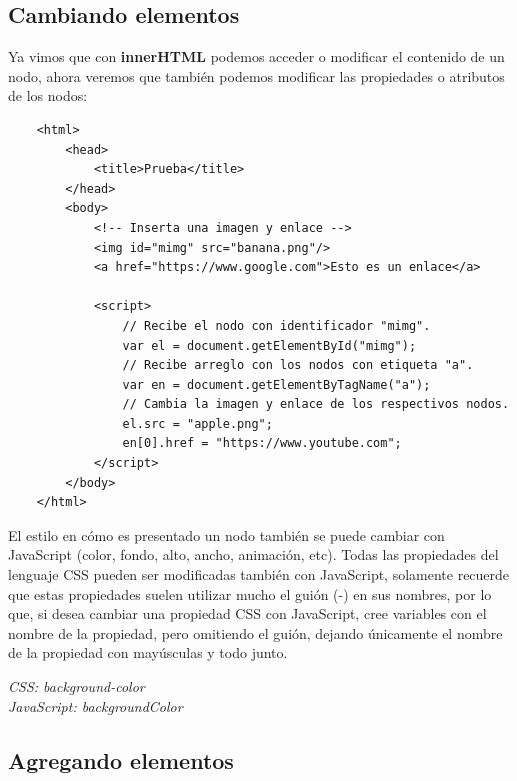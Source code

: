 \subsection{Cambiando elementos}

Ya vimos que con \textbf{innerHTML} podemos acceder o modificar el contenido de un nodo, ahora veremos que también podemos modificar las propiedades o atributos de los nodos:
\begin{lstlisting}
    <html>
        <head>
            <title>Prueba</title>
        </head>
        <body>
            <!-- Inserta una imagen y enlace -->
            <img id="mimg" src="banana.png"/>
            <a href="https://www.google.com">Esto es un enlace</a>
            
            <script>
                // Recibe el nodo con identificador "mimg".
                var el = document.getElementById("mimg");
                // Recibe arreglo con los nodos con etiqueta "a".
                var en = document.getElementByTagName("a");
                // Cambia la imagen y enlace de los respectivos nodos.
                el.src = "apple.png";
                en[0].href = "https://www.youtube.com";
            </script>
        </body>
    </html>
\end{lstlisting}

El estilo en cómo es presentado un nodo también se puede cambiar con JavaScript (color, fondo, alto, ancho, animación, etc). Todas las propiedades del lenguaje CSS pueden ser modificadas también con JavaScript, solamente recuerde que estas propiedades suelen utilizar mucho el guión (-) en sus nombres, por lo que, si desea cambiar una propiedad CSS con JavaScript, cree variables con el nombre de la propiedad, pero omitiendo el guión, dejando únicamente el nombre de la propiedad con mayúsculas y todo junto.
\begin{center}
    \textit{CSS: background-color\\JavaScript: backgroundColor}
\end{center}


\subsection{Agregando elementos}


